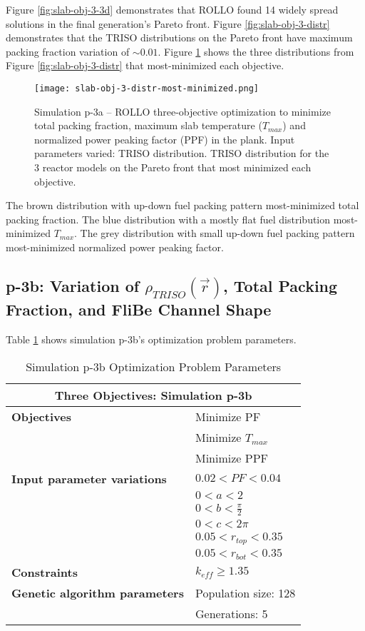 Figure \ref{fig:slab-obj-3-3d} demonstrates that \gls{ROLLO} found 14 widely spread 
solutions in the final generation's Pareto front. 
Figure \ref{fig:slab-obj-3-distr} demonstrates that the TRISO distributions on the
Pareto front have maximum packing fraction variation of $\sim0.01$. 
Figure \ref{fig:slab-obj-3-distr-most-minimized} shows the three distributions from 
Figure \ref{fig:slab-obj-3-distr} that most-minimized each objective. 
\begin{figure}[htbp]
    \texttt{[image: slab-obj-3-distr-most-minimized.png]}
    \caption{Simulation p-3a -- ROLLO three-objective optimization to minimize total packing fraction, 
    maximum slab temperature ($T_{max}$) and normalized power peaking factor (PPF) in the plank. 
    Input parameters varied: TRISO distribution. TRISO distribution for the 3 reactor models on the Pareto front
    that most minimized each objective.}
    \label{fig:slab-obj-3-distr-most-minimized}
\end{figure}
The brown distribution with up-down fuel packing pattern most-minimized total packing fraction. 
The blue distribution with a mostly flat fuel distribution most-minimized $T_{max}$. 
The grey distribution with small up-down fuel packing pattern most-minimized normalized 
power peaking factor. 

\subsection{p-3b: Variation of $\rho_{TRISO}(\vec{r})$, Total Packing Fraction, and FliBe Channel Shape}
Table \ref{tab:simulationp3b} shows simulation p-3b's optimization problem parameters. 
\begin{table}[htbp]
    \centering
    \onehalfspacing
    \caption{Simulation p-3b Optimization Problem Parameters}
	\label{tab:simulationp3b}
    \footnotesize
    \begin{tabular}{l|p{4cm}}
    \hline 
    \multicolumn{2}{c}{\textbf{Three Objectives: Simulation p-3b}} \\
    \hline 
    \textbf{Objectives} & Minimize PF \\
    & Minimize $T_{max}$ \\
    & Minimize PPF \\
    \hline 
    \textbf{Input parameter variations} & $0.02<PF<0.04$ \\
    & $0<a<2$ \\
    & $0<b<\frac{\pi}{2}$ \\
    & $0<c<2\pi$ \\
    & $0.05<r_{top}<0.35$ \\
    & $0.05<r_{bot}<0.35$ \\
    \hline
    \textbf{Constraints} & $k_{eff} \geq 1.35$\\ 
    \hline 
    \textbf{Genetic algorithm parameters} & Population size: 128 \\
    & Generations: 5 \\
    \hline
    \end{tabular}
\end{table}

